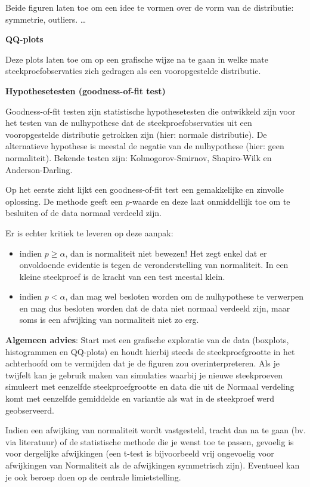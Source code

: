 \documentclass[
  12pt,dutch]{book}
\providecommand{\tightlist}{%
  \setlength{\itemsep}{0pt}\setlength{\parskip}{0pt}}
\theoremstyle{definition}
\theoremstyle{definition}
\theoremstyle{definition}
\theoremstyle{definition}
\theoremstyle{remark}
\begin{document}
Beide figuren laten toe om een idee te vormen over de vorm van de distributie: symmetrie, outliers. \ldots

\textbf{QQ-plots}

Deze plots laten toe om op een grafische wijze na te gaan in welke mate steekproefobservaties zich gedragen als een vooropgestelde distributie.

\textbf{Hypothesetesten (goodness-of-fit test)}

Goodness-of-fit testen zijn statistische hypothesetesten die ontwikkeld zijn voor het testen van de nulhypothese dat de steekproefobservaties uit een vooropgestelde distributie getrokken zijn (hier: normale distributie). De alternatieve hypothese is meestal de negatie van de nulhypothese (hier: geen normaliteit). Bekende testen zijn: Kolmogorov-Smirnov, Shapiro-Wilk en Anderson-Darling.

Op het eerste zicht lijkt een goodness-of-fit test een gemakkelijke en zinvolle oplossing. De methode geeft een \(p\)-waarde en deze laat onmiddellijk toe om te besluiten of de data normaal verdeeld zijn.

Er is echter kritiek te leveren op deze aanpak:

\begin{itemize}
\tightlist
\item
  indien \(p\geq \alpha\), dan is normaliteit niet bewezen! Het zegt enkel dat er onvoldoende evidentie is tegen de veronderstelling van normaliteit. In een kleine steekproef is de kracht van een test meestal klein.
\item
  indien \(p<\alpha\), dan mag wel besloten worden om de nulhypothese te verwerpen en mag dus besloten worden dat de data niet normaal verdeeld zijn, maar soms is een afwijking van normaliteit niet zo erg.
\end{itemize}

\textbf{Algemeen advies}:
Start met een grafische exploratie van de data (boxplots, histogrammen en QQ-plots) en houdt hierbij steeds de steekproefgrootte in het achterhoofd om te vermijden dat je de figuren zou overinterpreteren. Als je twijfelt kan je gebruik maken van simulaties waarbij je nieuwe steekproeven simuleert met eenzelfde steekproefgrootte en data die uit de Normaal verdeling komt met eenzelfde gemiddelde en variantie als wat in de steekproef werd geobserveerd.

Indien een afwijking van normaliteit wordt vastgesteld, tracht dan na te gaan (bv. via literatuur) of de statistische methode die je wenst toe te passen, gevoelig is voor dergelijke afwijkingen (een t-test is bijvoorbeeld vrij ongevoelig voor afwijkingen van Normaliteit als de afwijkingen symmetrisch zijn). Eventueel kan je ook beroep doen op de centrale limietstelling.
\end{document}
